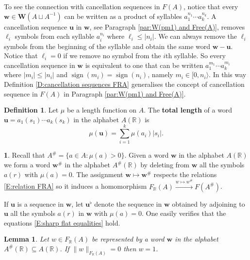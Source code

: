 \documentclass[12pt]{amsart}
\newtheorem{lemma}[prop]{Lemma}
\theoremstyle{definition}
\newtheorem{defn}[prop]{Definition}
\newtheorem{void}[prop]{}
\def\RR{\ensuremath{\mathbb{R}}}
\def\ZZ{\ensuremath{\mathbb{Z}}}
\newcommand{\B}[1]{\mathbf{#1}}
\newcommand{\xto}[1]{\xrightarrow{#1}}
\newcommand{\OP}[1]{\operatorname{#1}}
\def\Free{F}
\newcommand{\myinterval}[1]{[ #1 \rangle}
\begin{document}
To see the connection with cancellation sequences in $\Free(A)$, notice that every $\B w \in \B W(A \sqcup A^{-1})$ can be written as a product of syllables $a_1^{n_1} \cdots a_k^{n_k}$. %
A cancellation sequence $\B u$ in $\B w$, see Paragraph \ref{par:W(pm1) and Free(A)}, %
removes $\ell_i$ symbols from each syllable $a_i^{n_i}$ where $\ell_i \leq |n_i|$.
We can always remove the $\ell_i$ symbols from the beginning of the syllable and obtain the same word $\B w - \B u$.
Notice that $\ell_i=0$ if we remove no symbol from the $i$th syllable.
So every cancellation sequence in $\B w$ is equivalent to one that can be written $a_1^{m_1} \cdots a_k^{m_i}$ where $|m_i| \leq |n_i|$ and $\OP{sign}(m_i)=\OP{sign}(n_i)$, namely $m_i \in \myinterval{0,n_i}$.
In this way Definition \ref{D:cancellation sequences FRA} generalises the concept of cancellation sequence in $\Free(A)$ in Paragraph \ref{par:W(pm1) and Free(A)}. %




\begin{defn}\label{D:total weight FRA}
Let $\mu$ be a length function on $A$.
The {\bf total length} of a word $\B u = a_1(s_1) \cdots a_k(s_k)$ in the alphabet $A(\RR)$ is
\[
\mu(\B u) = \sum_{i=1}^k \mu(a_i) |s_i|.
\]
\end{defn}




\begin{void}\label{V:shaps and flats in FRA}
Recall that $A^\# = \{a \in A : \mu(a)>0\}$.
Given a word $\B w$ in the alphabet $A(\RR)$ we form a word $\B w^\#$ in the alphabet $A^\#(\RR)$ by deleting from $\B w$ all the symbols $a(r)$ with $\mu(a)=0$.
The assignment $\B w \mapsto \B w^\#$ respects the relations \eqref{E:relation FRA} so it induces a homomorphism $\Free_\RR(A) \xto{w \mapsto w^\#} \Free(A^\#)$.

If $\B u$ is a sequence in $\B w$, let $\B u^\flat$ denote the sequence in $\B w$ obtained by adjoining to $\B u$ all the symbols $a(r)$ in $\B w$ with $\mu(a)=0$.
One easily verifies that the equations \eqref{E:sharp flat equalities} hold.
\end{void}



\begin{lemma}\label{L:reduced in FRA non trivial}
Let $w \in \Free_\RR(A)$ be represented by a word $\B w$ in the alphabet $A^\#(\RR) \subseteq A(\RR)$.
If $\|w\|_{\Free_\RR(A)} =0$ then $w=1$.
\end{lemma}
\end{document}
